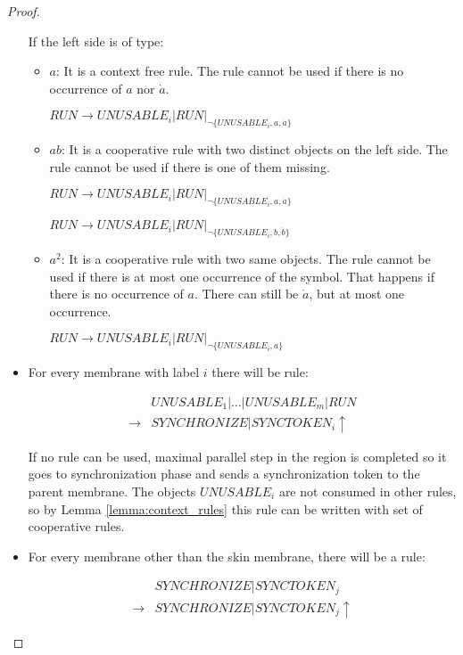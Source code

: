 \begin{proof}
\begin{itemize}
    If the left side is of type:
    \begin{itemize}
      \item $a$: It is a context free rule. The rule cannot be used if there is no occurrence of $a$ nor $\dot{a}$.

      $RUN \rightarrow UNUSABLE_i|RUN|_{\neg\{UNUSABLE_i, a, \dot{a}\}}$

      \item $ab$: It is a cooperative rule with two distinct objects on the left side. The rule cannot be used if there is one of them missing.

      $RUN \rightarrow UNUSABLE_i|RUN|_{\neg\{UNUSABLE_i, a, \dot{a}\}}$

      $RUN \rightarrow UNUSABLE_i|RUN|_{\neg\{UNUSABLE_i, b, \dot{b}\}}$

      \item $a^2$: It is a cooperative rule with two same objects. The rule cannot be used if there is at most one occurrence of the symbol. That happens if there is no occurrence of $a$. There can still be $\dot{a}$, but at most one occurrence.

      $RUN \rightarrow UNUSABLE_i|RUN|_{\neg\{UNUSABLE_i, a\}}$
    \end{itemize}

    

    \item For every membrane with label $i$ there will be rule:

    \begin{align*}
      &UNUSABLE_1|\dots|UNUSABLE_m|RUN \\
      \rightarrow &SYNCHRONIZE|SYNCTOKEN_i\uparrow
    \end{align*}

    If no rule can be used, maximal parallel step in the region is completed so it goes to synchronization phase and sends a synchronization token to the parent membrane. The objects $UNUSABLE_i$ are not consumed in other rules, so by Lemma \ref{lemma:context_rules} this rule can be written with set of cooperative rules.

    \item For every membrane other than the skin membrane, there will be a rule:

    \begin{align*}
      &SYNCHRONIZE|SYNCTOKEN_j \\
      \rightarrow &SYNCHRONIZE|SYNCTOKEN_j\uparrow
    \end{align*}


\end{itemize}
\end{proof}
